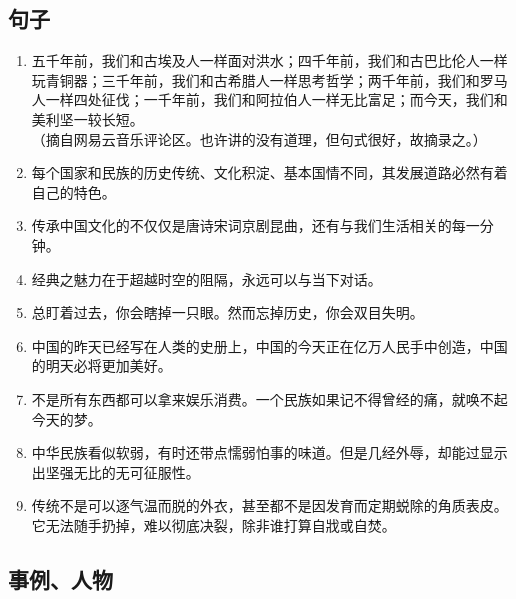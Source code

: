 \subsection{句子}
\begin{enumerate}
\item 五千年前，我们和古埃及人一样面对洪水；四千年前，我们和古巴比伦人一样玩青铜器；三千年前，我们和古希腊人一样思考哲学；两千年前，我们和罗马人一样四处征伐；一千年前，我们和阿拉伯人一样无比富足；而今天，我们和美利坚一较长短。\\
（摘自网易云音乐评论区。也许讲的没有道理，但句式很好，故摘录之。）
\item 每个国家和民族的历史传统、文化积淀、基本国情不同，其发展道路必然有着自己的特色。
\item 传承中国文化的不仅仅是唐诗宋词京剧昆曲，还有与我们生活相关的每一分钟。
\item 经典之魅力在于超越时空的阻隔，永远可以与当下对话。
\item 总盯着过去，你会瞎掉一只眼。然而忘掉历史，你会双目失明。
\item 中国的昨天已经写在人类的史册上，中国的今天正在亿万人民手中创造，中国的明天必将更加美好。
\item 不是所有东西都可以拿来娱乐消费。一个民族如果记不得曾经的痛，就唤不起今天的梦。
\item 中华民族看似软弱，有时还带点懦弱怕事的味道。但是几经外辱，却能过显示出坚强无比的无可征服性。
\item 传统不是可以逐气温而脱的外衣，甚至都不是因发育而定期蜕除的角质表皮。它无法随手扔掉，难以彻底决裂，除非谁打算自戕或自焚。
\end{enumerate}
\subsection{事例、人物}


